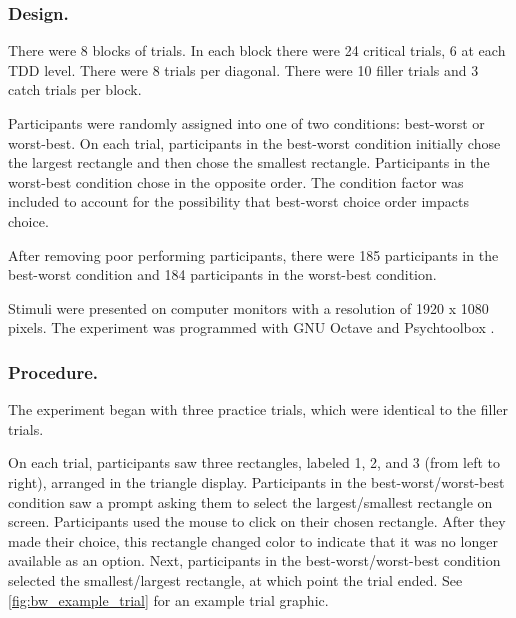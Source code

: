 \subsubsection{Design.}
There were 8 blocks of trials. In each block there were 24 critical trials, 6 at each TDD level. There were 8 trials per diagonal. There were 10 filler trials and 3 catch trials per block.

Participants were randomly assigned into one of two conditions: best-worst or worst-best. On each trial, participants in the best-worst condition initially chose the largest rectangle and then chose the smallest rectangle. Participants in the worst-best condition chose in the opposite order. The condition factor was included to account for the possibility that best-worst choice order impacts choice.

After removing poor performing participants, there were 185 participants in the best-worst condition and 184 participants in the worst-best condition.

Stimuli were presented on computer monitors with a resolution of 1920 x 1080 pixels. The experiment was programmed with GNU Octave and Psychtoolbox \parencite{octave,brainardPsychophysicsToolbox1997}. 

\subsubsection{Procedure.}

The experiment began with three practice trials, which were identical to the filler trials. 

On each trial, participants saw three rectangles, labeled 1, 2, and 3 (from left to right), arranged in the triangle display. Participants in the best-worst/worst-best condition saw a prompt asking them to select the largest/smallest rectangle on screen. Participants used the mouse to click on their chosen rectangle. After they made their choice, this rectangle changed color to indicate that it was no longer available as an option. Next, participants in the best-worst/worst-best condition selected the smallest/largest rectangle, at which point the trial ended. See \ref{fig:bw_example_trial} for an example trial graphic.

